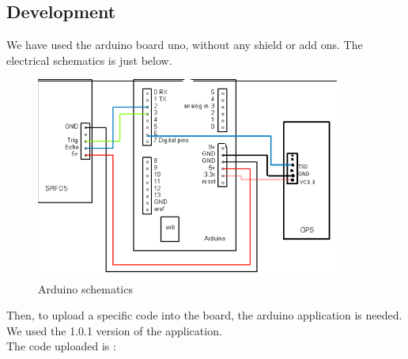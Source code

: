 \subsection{Development}
We have used the arduino board uno, without any shield or add ons. The electrical schematics is just below.\\

\begin{figure}[!h] 
\begin{center}
\includegraphics[width=10cm]{imgs/Capture-1.png}
\caption{Arduino schematics} 
\label{img1} 
\end{center}
\end{figure} 

Then, to upload a specific code into the board, the arduino application is needed. We used the 1.0.1 version of the application.\\

The code uploaded is :\\

